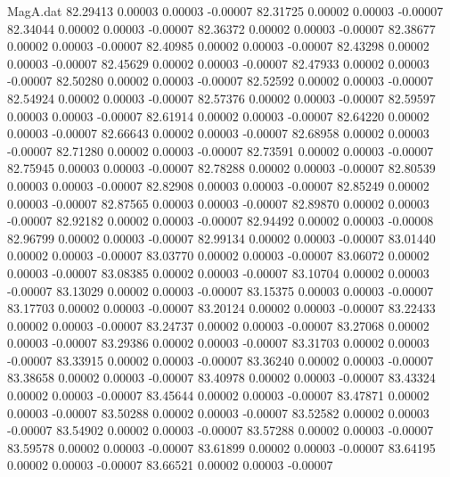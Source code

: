 \begin{filecontents}{MagA.dat}
  82.29413    0.00003    0.00003   -0.00007
  82.31725    0.00002    0.00003   -0.00007
  82.34044    0.00002    0.00003   -0.00007
  82.36372    0.00002    0.00003   -0.00007
  82.38677    0.00002    0.00003   -0.00007
  82.40985    0.00002    0.00003   -0.00007
  82.43298    0.00002    0.00003   -0.00007
  82.45629    0.00002    0.00003   -0.00007
  82.47933    0.00002    0.00003   -0.00007
  82.50280    0.00002    0.00003   -0.00007
  82.52592    0.00002    0.00003   -0.00007
  82.54924    0.00002    0.00003   -0.00007
  82.57376    0.00002    0.00003   -0.00007
  82.59597    0.00003    0.00003   -0.00007
  82.61914    0.00002    0.00003   -0.00007
  82.64220    0.00002    0.00003   -0.00007
  82.66643    0.00002    0.00003   -0.00007
  82.68958    0.00002    0.00003   -0.00007
  82.71280    0.00002    0.00003   -0.00007
  82.73591    0.00002    0.00003   -0.00007
  82.75945    0.00003    0.00003   -0.00007
  82.78288    0.00002    0.00003   -0.00007
  82.80539    0.00003    0.00003   -0.00007
  82.82908    0.00003    0.00003   -0.00007
  82.85249    0.00002    0.00003   -0.00007
  82.87565    0.00003    0.00003   -0.00007
  82.89870    0.00002    0.00003   -0.00007
  82.92182    0.00002    0.00003   -0.00007
  82.94492    0.00002    0.00003   -0.00008
  82.96799    0.00002    0.00003   -0.00007
  82.99134    0.00002    0.00003   -0.00007
  83.01440    0.00002    0.00003   -0.00007
  83.03770    0.00002    0.00003   -0.00007
  83.06072    0.00002    0.00003   -0.00007
  83.08385    0.00002    0.00003   -0.00007
  83.10704    0.00002    0.00003   -0.00007
  83.13029    0.00002    0.00003   -0.00007
  83.15375    0.00003    0.00003   -0.00007
  83.17703    0.00002    0.00003   -0.00007
  83.20124    0.00002    0.00003   -0.00007
  83.22433    0.00002    0.00003   -0.00007
  83.24737    0.00002    0.00003   -0.00007
  83.27068    0.00002    0.00003   -0.00007
  83.29386    0.00002    0.00003   -0.00007
  83.31703    0.00002    0.00003   -0.00007
  83.33915    0.00002    0.00003   -0.00007
  83.36240    0.00002    0.00003   -0.00007
  83.38658    0.00002    0.00003   -0.00007
  83.40978    0.00002    0.00003   -0.00007
  83.43324    0.00002    0.00003   -0.00007
  83.45644    0.00002    0.00003   -0.00007
  83.47871    0.00002    0.00003   -0.00007
  83.50288    0.00002    0.00003   -0.00007
  83.52582    0.00002    0.00003   -0.00007
  83.54902    0.00002    0.00003   -0.00007
  83.57288    0.00002    0.00003   -0.00007
  83.59578    0.00002    0.00003   -0.00007
  83.61899    0.00002    0.00003   -0.00007
  83.64195    0.00002    0.00003   -0.00007
  83.66521    0.00002    0.00003   -0.00007

\end{filecontents}
